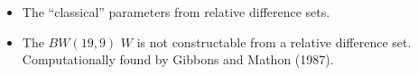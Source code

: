 \documentclass{beamer}
\newcommand{\rds}[1]{#1 \mymin RDS}
\begin{document}


\begin{frame}

  \begin{itemize}
  \item The ``classical'' parameters from relative difference sets.
  \item The $BW(19,9)$ $W$ is not constructable from a relative difference set.
    Computationally found by Gibbons and Mathon (1987).
  \end{itemize}

\end{frame}



\end{document}

